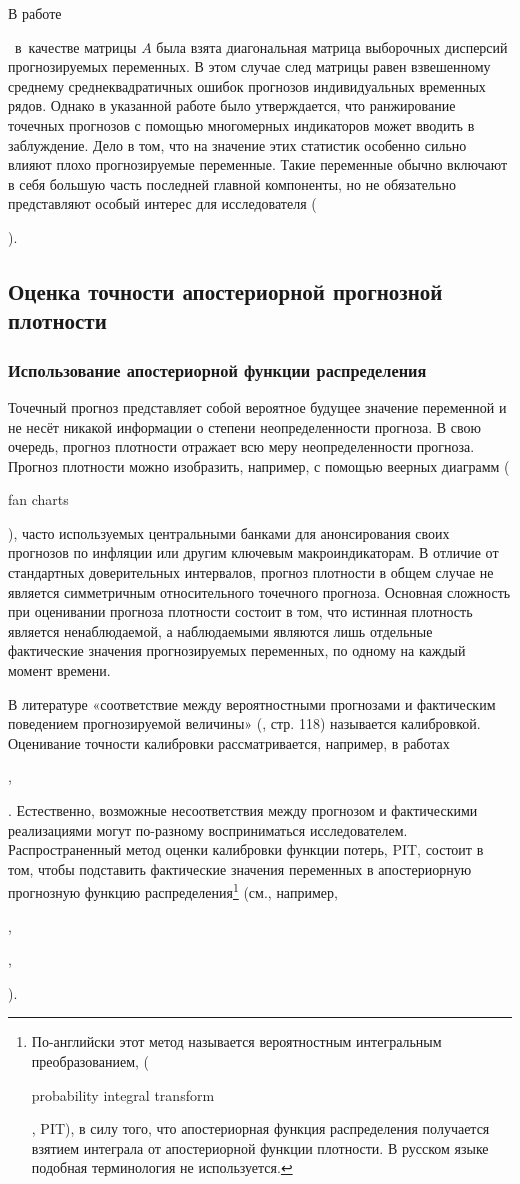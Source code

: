 \documentclass[11pt]{article} %
\newcommand{\eng}[1]{\begin{otherlanguage}{english}#1\end{otherlanguage}}
\begin{document}
В работе \eng{\cite{adolfson_al_2007}}~в~качестве матрицы $A$ была взята диагональная матрица выборочных дисперсий прогнозируемых переменных. В этом случае след матрицы равен взвешенному среднему среднеквадратичных ошибок прогнозов индивидуальных временных рядов. Однако в указанной работе было утверждается, что ранжирование точечных прогнозов с помощью многомерных индикаторов может вводить в заблуждение.
Дело в том, что на значение этих статистик особенно сильно влияют плохо прогнозируемые переменные. Такие переменные обычно включают в себя большую часть последней главной компоненты, но не обязательно представляют особый интерес для исследователя (\eng{\cite{adolfson_al_2007}}).




\subsection{Оценка точности апостериорной прогнозной плотности}

\subsubsection{Использование апостериорной функции распределения}

Точечный прогноз представляет собой  вероятное будущее значение переменной и не несёт никакой информации о степени неопределенности прогноза. В свою очередь, прогноз плотности отражает всю меру неопределенности прогноза. Прогноз плотности можно изобразить, например, с помощью веерных диаграмм (\eng{fan charts}), часто используемых центральными банками для анонсирования своих прогнозов по инфляции или другим ключевым макроиндикаторам. В отличие от стандартных доверительных интервалов, прогноз плотности в общем случае не является симметричным относительного точечного прогноза.
Основная сложность при оценивании прогноза плотности состоит в том, что истинная плотность является ненаблюдаемой, а наблюдаемыми являются лишь отдельные фактические значения прогнозируемых переменных, по одному на каждый момент времени.

В литературе «соответствие между вероятностными прогнозами и фактическим поведением прогнозируемой величины» (\cite{tsyplakov_2012}, стр. 118) называется калибровкой. Оценивание точности калибровки рассматривается, например, в работах \eng{\cite{gneiting_al_2007}}, \eng{\cite{mitchell_wallis_2011}}.
Естественно, возможные несоответствия между прогнозом и фактическими реализациями могут по-разному восприниматься исследователем. Распространенный метод оценки калибровки функции потерь, PIT, состоит в том, чтобы подставить фактические значения переменных в апостериорную прогнозную функцию распределения\footnote{По-английски этот метод называется вероятностным интегральным преобразованием, (\eng{probability integral transform}, PIT), в силу того, что апостериорная функция распределения получается взятием интеграла от апостериорной функции плотности. В русском языке подобная терминология не используется.} (см., например, \eng{\cite{diebold_al_1998}},
\eng{\cite{gerdrup_al_2009}}, \eng{\cite{gonzalez-rivera_sun_2015}}).
\end{document}
